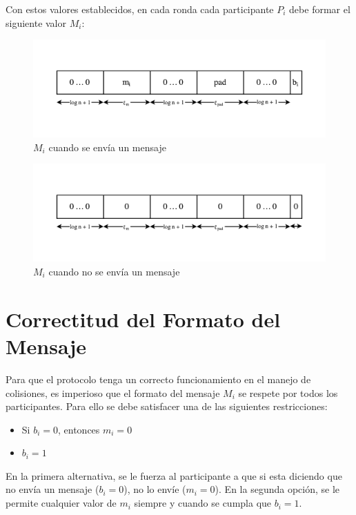 Con estos valores establecidos, en cada ronda cada participante $P_i$ debe formar 
el siguiente valor $M_i$:

\begin{figure}[H]
  \centering
    \includegraphics[width=1\textwidth]{imagenes/message-format(1).pdf}
  \caption{$M_i$ cuando se envía un mensaje}
\end{figure}

\begin{figure}[H]
  \centering
    \includegraphics[width=1\textwidth]{imagenes/message-format-nomessage.pdf}
  \caption{$M_i$ cuando no se envía un mensaje}
\end{figure}

\section{Correctitud del Formato del Mensaje}

Para que el protocolo tenga un correcto funcionamiento en el manejo de colisiones, 
es imperioso que el formato del mensaje $M_i$ se respete por todos los participantes. 
Para ello se debe satisfacer una de las siguientes restricciones:
\begin{itemize}
    \item Si $b_i = 0$, entonces $m_i = 0$
    \item $b_i = 1$
\end{itemize}
En la primera alternativa, se le fuerza al participante a que si esta diciendo que 
no envía un mensaje ($b_i = 0$), no lo envíe ($m_i = 0$). En la segunda opción, se 
le permite cualquier valor de $m_i$ siempre y cuando se cumpla que $b_i = 1$.

